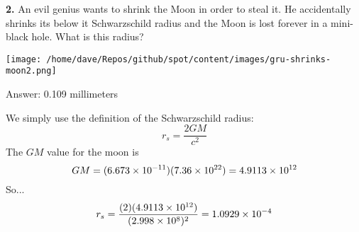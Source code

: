 \documentclass{article}
\begin{document}
\textbf{2.} \quad An evil genius wants to shrink the Moon in order to steal it. He
accidentally shrinks its below it Schwarzschild radius and the Moon
is lost forever in a mini-black hole. What is this radius?


\begin{center}
\texttt{[image: /home/dave/Repos/github/spot/content/images/gru-shrinks-moon2.png]}

\label{fig:gru-shrinks-moon2-png}
\end{center}
\par {\footnotesize\sf Answer: 0.109 millimeters}
\par We simply use the definition of the Schwarzschild radius:
%
\begin{equation*}
r_s = \frac{2GM}{c^2}
\end{equation*}
The $GM$ value for the moon is
%
\begin{equation*}
GM = (6.673 \times 10^{-11})(7.36 \times 10^{22})
= 4.9113 \times 10^{12}
\end{equation*}
So...
%
\begin{equation*}
r_s = \frac{(2)(4.9113 \times 10^{12})}{(2.998 \times 10^{8})^2}
= 1.0929 \times 10^{-4}
\end{equation*}
\newpage
\end{document}
